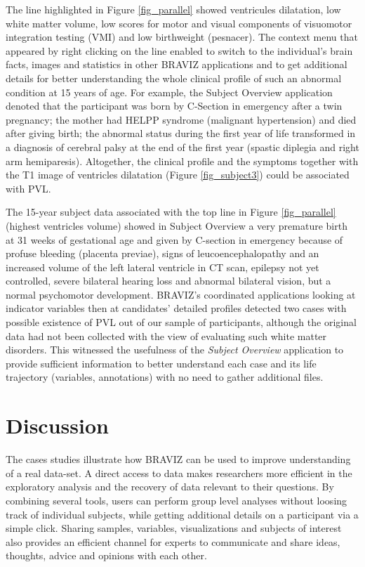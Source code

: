 \documentclass{frontiersHLTH}
\begin{document}
The line highlighted in Figure \ref{fig_parallel} showed ventricules dilatation, low white matter volume, low scores for motor and visual components of visuomotor integration testing (VMI) and low birthweight (pesnacer). The context menu that appeared by right clicking on the line enabled to  switch  to the individual's brain facts, images and statistics in other BRAVIZ applications and to get additional details for better understanding the whole clinical profile of such an abnormal condition at 15 years of age. For example, the Subject Overview application denoted that the participant was born by C-Section in emergency after a twin pregnancy; the mother had HELPP syndrome (malignant hypertension) and died after giving birth; the abnormal status during the first year of life transformed in a diagnosis of cerebral palsy at the end of the first year (spastic diplegia and right arm hemiparesis). Altogether, the clinical profile and the symptoms together with the T1 image of ventricles dilatation (Figure \ref{fig_subject3}) could be associated with PVL.

The 15-year subject data associated with the top line in Figure \ref{fig_parallel} (highest ventricles volume) showed in  Subject Overview  a very premature birth at 31 weeks of gestational age and given by C-section in emergency because of profuse bleeding (placenta previae), signs of leucoencephalopathy and an increased volume of the left lateral ventricle in CT scan, epilepsy not yet controlled, severe bilateral hearing loss and abnormal bilateral vision, but a normal psychomotor development. BRAVIZ’s coordinated applications looking at indicator variables then at candidates' detailed profiles detected two cases with possible existence of PVL out of our sample of participants, although the original data had not been collected with the view of evaluating such white matter disorders. This witnessed the usefulness of the \emph{Subject Overview} application to provide sufficient information to better understand each case and its life trajectory (variables, annotations) with no need to gather additional files.

\section{Discussion}
\label{sec:disc}

The cases studies illustrate how BRAVIZ can be used to improve understanding of a real data-set. 
A direct access to data makes researchers more efficient in the exploratory analysis and the recovery of data relevant to their questions. By combining several tools, users can perform group level analyses without loosing track of individual subjects, while getting additional details on a participant via a simple click. Sharing samples, variables, visualizations and subjects of interest also provides an efficient channel for experts to communicate and share ideas, thoughts, advice and opinions with each other.
\end{document}
